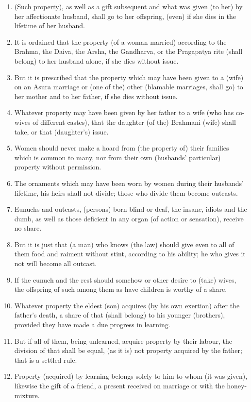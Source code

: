 \begin{enumerate}
\item (Such property), as well as a gift subsequent and what was given (to her) by her affectionate husband, shall go to her offspring, (even) if she dies in the lifetime of her husband.
\item It is ordained that the property (of a woman married) according to the Brahma, the Daiva, the Arsha, the Gandharva, or the Pragapatya rite (shall belong) to her husband alone, if she dies without issue.
\item But it is prescribed that the property which may have been given to a (wife) on an Asura marriage or (one of the) other (blamable marriages, shall go) to her mother and to her father, if she dies without issue.
\item Whatever property may have been given by her father to a wife (who has co-wives of different castes), that the daughter (of the) Brahmani (wife) shall take, or that (daughter's) issue.
\item Women should never make a hoard from (the property of) their families which is common to many, nor from their own (husbands' particular) property without permission.
\item The ornaments which may have been worn by women during their husbands' lifetime, his heirs shall not divide; those who divide them become outcasts.
\item Eunuchs and outcasts, (persons) born blind or deaf, the insane, idiots and the dumb, as well as those deficient in any organ (of action or sensation), receive no share.
\item But it is just that (a man) who knows (the law) should give even to all of them food and raiment without stint, according to his ability; he who gives it not will become all outcast.
\item If the eunuch and the rest should somehow or other desire to (take) wives, the offspring of such among them as have children is worthy of a share.
\item Whatever property the eldest (son) acquires (by his own exertion) after the father's death, a share of that (shall belong) to his younger (brothers), provided they have made a due progress in learning.
\item But if all of them, being unlearned, acquire property by their labour, the division of that shall be equal, (as it is) not property acquired by the father; that is a settled rule.
\item Property (acquired) by learning belongs solely to him to whom (it was given), likewise the gift of a friend, a present received on marriage or with the honey-mixture.

\end{enumerate}
